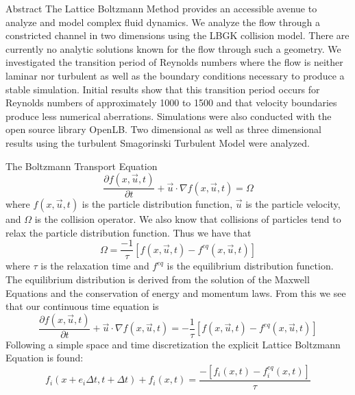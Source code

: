 \documentclass[
    a0paper, %
    landscape, %
    fontscale=0.34 %
    ]{baposter}
\newcommand{\beq}{\begin{equation}}
\newcommand{\eeq}{\end{equation}}
\newcommand{\beqs}{\begin{equation*}}
\newcommand{\eeqs}{\end{equation*}}
\newcommand{\of}[1]{\left(#1\right)}
\begin{document}
\begin{poster}
\begin{posterbox}[name=intro,column=0,span=2, row=0]{Abstract}
The Lattice Boltzmann Method provides an accessible avenue to analyze and model complex fluid dynamics. We analyze the flow through a constricted channel in two dimensions using the LBGK collision model. There are currently no analytic solutions known for the flow through such a geometry. We investigated the transition period of Reynolds numbers where the flow is neither laminar nor turbulent as well as the boundary conditions necessary to produce a stable simulation. Initial results show that this transition period occurs for Reynolds numbers of approximately 1000 to 1500 and that velocity boundaries produce less numerical aberrations. Simulations were also conducted with the open source library OpenLB. Two dimensional as well as three dimensional results using the turbulent Smagorinski Turbulent Model were analyzed.
\end{posterbox}


\begin{posterbox}[name=def,column=0,span=2, below=intro]{The Boltzmann Transport Equation}
\beq \frac{\partial f\of{x,\vec{u},t}}{\partial t} + \vec{u}\cdot \nabla f\of{x,\vec{u},t} = \Omega \eeq
where $f\of{x,\vec{u},t}$ is the particle distribution function, $\vec{u}$ is the particle velocity, and $\Omega$ is the collision operator. We also know that collisions of particles tend to relax the particle distribution function. Thus we have that 
\beqs \Omega = \frac{-1}{\tau}\left[ f\of{x,\vec{u},t} - f^{eq}\of{x,\vec{u},t}\right] \eeqs
where $\tau$ is the relaxation time and $f^{eq}$ is the equilibrium distribution function. The equilibrium distribution is derived from the solution of the Maxwell Equations and the conservation of energy and momentum laws. From this we see that our continuous time equation is 
\beqs  \frac{\partial f\of{x,\vec{u},t}}{\partial t} + \vec{u}\cdot \nabla f\of{x,\vec{u},t} = -\frac{1}{\tau}\left[ f\of{x,\vec{u},t} - f^{eq}\of{x,\vec{u},t}\right] \eeqs
Following a simple space and time discretization the explicit Lattice Boltzmann Equation is found:
\beq f_i\of{x+e_i \Delta t, t + \Delta t} + f_i\of{x,t} = \frac{-\left[ f_i\of{x,t} - f_i^{eq}\of{x,t}\right] }{\tau}\eeq
\end{posterbox}



\end{poster}
\end{document}
